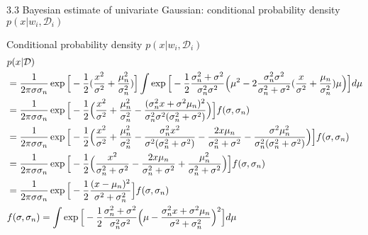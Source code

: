 \documentclass[compress,blue]{beamer}
\newcommand{\calD}{\mathcal{D}}
\begin{document}
\begin{frame}{3.3 Bayesian estimate of univariate Gaussian: conditional probability density $p(x | w_i, \calD_i)$}
	\vspace{-0.1in}
	\begin{block}{Conditional probability density $p(x | w_i, \calD_i)$}
		\vspace{-0.15in}
		\tiny
		\begin{align}
			& p(x | \calD) \\
			&=\frac{1}{2\pi\sigma\sigma_n}\exp\Big[-\frac{1}{2}(\frac{x^2}{\sigma^2}+\frac{\mu_n^2}{\sigma_n^2})\Big]\int\exp\Big[-\frac{1}{2}\frac{\sigma_n^2 + \sigma^2}{\sigma_n^2\sigma^2}\Big(\mu^2 - 2\frac{\sigma_n^2\sigma^2}{\sigma_n^2 + \sigma^2}(\frac{x}{\sigma^2} + \frac{\mu_n}{\sigma_n^2})\mu\Big)\Big]d\mu\\
			&=\frac{1}{2\pi\sigma\sigma_n}\exp\Big[-\frac{1}{2}\Big(\frac{x^2}{\sigma^2}+\frac{\mu_n^2}{\sigma_n^2} - \frac{(\sigma_n^2 x + \sigma^2\mu_n)^2}{\sigma^2_n\sigma^2(\sigma_n^2+\sigma^2)}\Big)\Big]f(\sigma, \sigma_n)\\
			& = \frac{1}{2\pi\sigma\sigma_n}\exp\Big[-\frac{1}{2}\Big(\frac{x^2}{\sigma^2}+\frac{\mu_n^2}{\sigma_n^2} - \frac{\sigma_n^2 x^2}{\sigma^2(\sigma_n^2 + \sigma^2)} -\frac{2x\mu_n}{\sigma_n^2 + \sigma^2} - \frac{\sigma^2\mu_n^2}{\sigma^2_n(\sigma_n^2+\sigma^2)}\Big)\Big]f(\sigma, \sigma_n)\\
			& = \frac{1}{2\pi\sigma\sigma_n}\exp\Big[-\frac{1}{2}\Big(\frac{x^2}{\sigma_n^2 + \sigma^2} -\frac{2x\mu_n}{\sigma_n^2 + \sigma^2} + \frac{\mu_n^2}{\sigma_n^2+\sigma^2}\Big)\Big]f(\sigma, \sigma_n)\\
			& = \frac{1}{2\pi\sigma\sigma_n}\exp\Big[-\frac{1}{2}\frac{(x-\mu_n)^2}{\sigma^2+\sigma^2_n}\Big]f(\sigma, \sigma_n)\\
			\vspace{0.3in}
			&f(\sigma, \sigma_n) = \int\exp\Big[-\frac{1}{2}\frac{\sigma_n^2 + \sigma^2}{\sigma_n^2\sigma^2}\Big(\mu - \frac{\sigma_n^2 x + \sigma^2\mu_n}{\sigma^2 + \sigma_n^2}\Big)^2\Big]d\mu \nonumber
		\end{align}
		\normalsize
	\end{block}
\end{frame}
\end{document}
